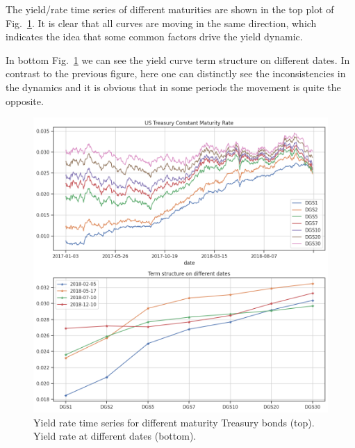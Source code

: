 The yield/rate time series of different maturities are shown in the top plot of Fig.~\ref{fig:yield_rate_ts}. It is clear that all curves are moving in the same direction, which indicates the idea that some common factors drive the yield dynamic.

In bottom Fig.~\ref{fig:yield_rate_ts} we can see the yield curve term structure on different dates. In contrast to the previous figure, here one can distinctly see the inconsistencies in the dynamics and it is obvious that in some periods the movement is quite the opposite.

\begin{figure}[htbp]
	\centering
	\includegraphics[width=0.7\linewidth]{figures/yield_rate_ts}
	\caption{Yield rate time series for different maturity Treasury bonds (top). Yield rate at different dates (bottom).}
	\label{fig:yield_rate_ts}
\end{figure}

